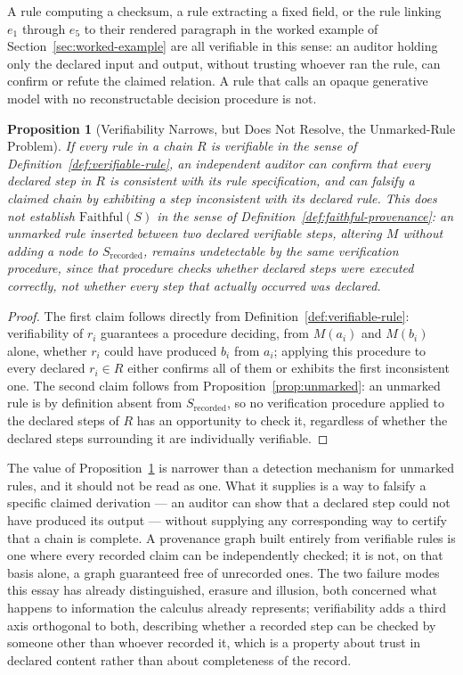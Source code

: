 \documentclass[11pt]{article}
\newtheorem{proposition}[theorem]{Proposition}
\theoremstyle{definition}
\begin{document}
A rule computing a checksum, a rule extracting a fixed field, or the rule linking $e_1$ through $e_5$ to their rendered paragraph in the worked example of Section~\ref{sec:worked-example} are all verifiable in this sense: an auditor holding only the declared input and output, without trusting whoever ran the rule, can confirm or refute the claimed relation. A rule that calls an opaque generative model with no reconstructable decision procedure is not.

\begin{proposition}[Verifiability Narrows, but Does Not Resolve, the Unmarked-Rule Problem]
\label{prop:verifiable}
If every rule in a chain $R$ is verifiable in the sense of Definition~\ref{def:verifiable-rule}, an independent auditor can confirm that every \emph{declared} step in $R$ is consistent with its rule specification, and can falsify a claimed chain by exhibiting a step inconsistent with its declared rule. This does not establish $\mathrm{Faithful}(S)$ in the sense of Definition~\ref{def:faithful-provenance}: an unmarked rule inserted between two declared verifiable steps, altering $M$ without adding a node to $S_{\mathrm{recorded}}$, remains undetectable by the same verification procedure, since that procedure checks whether declared steps were executed correctly, not whether every step that actually occurred was declared.
\end{proposition}

\begin{proof}
The first claim follows directly from Definition~\ref{def:verifiable-rule}: verifiability of $r_i$ guarantees a procedure deciding, from $M(a_i)$ and $M(b_i)$ alone, whether $r_i$ could have produced $b_i$ from $a_i$; applying this procedure to every declared $r_i \in R$ either confirms all of them or exhibits the first inconsistent one. The second claim follows from Proposition~\ref{prop:unmarked}: an unmarked rule is by definition absent from $S_{\mathrm{recorded}}$, so no verification procedure applied to the declared steps of $R$ has an opportunity to check it, regardless of whether the declared steps surrounding it are individually verifiable.
\end{proof}

The value of Proposition~\ref{prop:verifiable} is narrower than a detection mechanism for unmarked rules, and it should not be read as one. What it supplies is a way to falsify a specific claimed derivation --- an auditor can show that a declared step could not have produced its output --- without supplying any corresponding way to certify that a chain is complete. A provenance graph built entirely from verifiable rules is one where every recorded claim can be independently checked; it is not, on that basis alone, a graph guaranteed free of unrecorded ones. The two failure modes this essay has already distinguished, erasure and illusion, both concerned what happens to information the calculus already represents; verifiability adds a third axis orthogonal to both, describing whether a recorded step can be checked by someone other than whoever recorded it, which is a property about trust in declared content rather than about completeness of the record.
\end{document}
